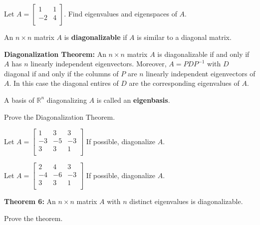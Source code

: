 \begin{enumerate}

\Problem Let $A=\begin{bmatrix} 1 & 1\\ -2 & 4\\ \end{bmatrix}$. Find eigenvalues and eigenspaces of $A$.

\vfill

\begin{defn}
An $n\times n$ matrix $A$ is {\bf diagonalizable} if $A$ is similar to a diagonal matrix.
\end{defn}

\newpage

{\bf Diagonalization Theorem:} An $n \times n$ matrix $A$ is diagonalizable if and only if $A$ has $n$ linearly independent eigenvectors. Moreover, $A=PDP^{-1}$ with $D$ diagonal if and only if the columns of $P$ are $n$ linearly independent eigenvectors of $A$. In this case the diagonal entires of $D$ are the corresponding eigenvalues of $A$.

\begin{defn} A basis of $\mathbb{R}^n$ diagonalizing $A$ is called an {\bf eigenbasis}. 
\end{defn}

\Problem Prove the Diagonalization Theorem.

\vfill

\Problem Let $A=\begin{bmatrix} 
1 & 3 & 3\\
-3 & -5 & -3\\
3 & 3 & 1\\
\end{bmatrix}$ If possible, diagonalize $A$.

\vfill

\newpage

\Problem Let $A=\begin{bmatrix} 
2 & 4 & 3\\
-4 & -6 & -3\\
3 & 3 & 1\\
\end{bmatrix}$ If possible, diagonalize $A$.


\vfill
\vfill

{\bf Theorem 6:} An $n \times n$ matrix $A$ with $n$ distinct eigenvalues is diagonalizable.

\Problem Prove the theorem.

\vfill

\newpage


\end{enumerate}

